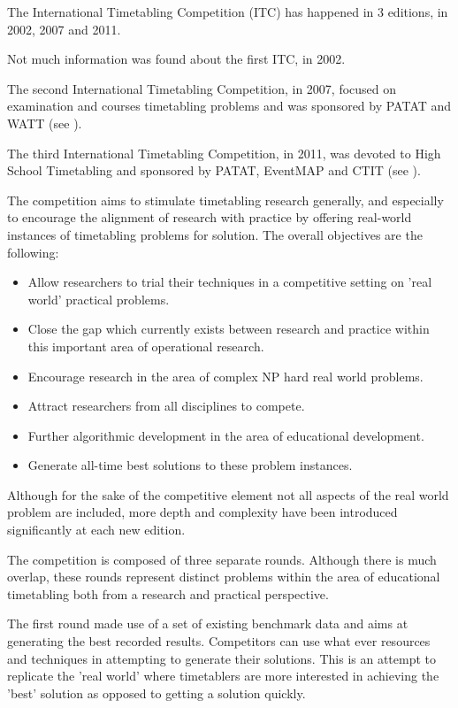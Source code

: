 The International Timetabling Competition (ITC) has happened in 3 editions, in 2002, 2007 and 2011.

Not much information was found about the first ITC, in 2002.

The second International Timetabling Competition, in 2007, focused on examination and courses timetabling problems and was sponsored by PATAT and WATT (see \cite{ITC2007}).

The third International Timetabling Competition, in 2011, was devoted to High School Timetabling and sponsored by PATAT, EventMAP and CTIT (see \cite{ITC2011}).

The competition aims to stimulate timetabling research generally, and especially to encourage the alignment of research with practice by offering real-world instances of timetabling problems for solution. The overall objectives are the following:
\begin{itemize}
\item Allow researchers to trial their techniques in a competitive setting on 'real world' practical problems.
\item Close the gap which currently exists between research and practice within this important area of operational research.
\item Encourage research in the area of complex NP hard real world problems.
\item Attract researchers from all disciplines to compete.
\item Further algorithmic development in the area of educational development.
\item Generate all-time best solutions to these problem instances.
\end{itemize}

Although for the sake of the competitive element not all aspects of the real world problem are included, more depth and complexity have been introduced significantly at each new edition.

The competition is composed of three separate rounds. Although there is much overlap, these rounds represent distinct problems within the area of educational timetabling both from a research and practical perspective.

The first round made use of a set of existing benchmark data and aims at generating the best recorded results. Competitors can use what ever resources and techniques in attempting to generate their solutions. This is an attempt to replicate the 'real world' where timetablers are more interested in achieving the 'best' solution as opposed to getting a solution quickly.


